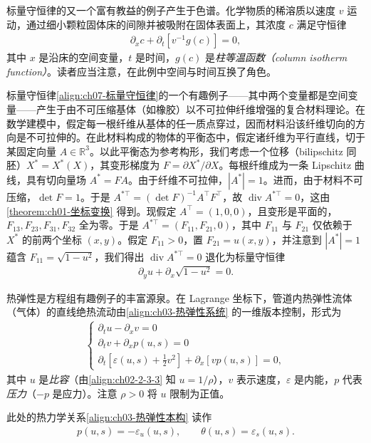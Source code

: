 \documentclass[../../main.tex]{subfiles}
\begin{document}
标量守恒律的又一个富有教益的例子产生于色谱。化学物质的稀溶质以速度 $v$ 运动，通过细小颗粒固体床的间隙并被吸附在固体表面上，其浓度 $c$ 满足守恒律
\begin{align}
\partial_x c+\partial_t[v^{-1}g(c)]=0,
\label{align:ch07-色谱}
\end{align}
其中 $x$ 是沿床的空间变量，$t$ 是时间，$g(c)$ 是\emph{柱等温函数（column isotherm function）}。读者应当注意，在此例中空间与时间互换了角色。

标量守恒律\eqref{align:ch07-标量守恒律}的一个有趣例子——其中两个变量都是空间变量——产生于由不可压缩基体（如橡胶）以不可拉伸纤维增强的复合材料理论。在数学建模中，假定每一根纤维从基体的任一质点穿过，因而材料沿该纤维切向的方向是不可拉伸的。在此材料构成的物体的平衡态中，假定诸纤维为平行直线，切于某固定向量 $A\in\mathbb{R}^3$。以此平衡态为参考构形，我们考虑一个位移（bilipschitz 同胚）$X^*=X^*(X)$，其变形梯度为 $F=\partial X^*/\partial X$。每根纤维成为一条 Lipschitz 曲线，具有切向量场 $A^*=FA$。由于纤维不可拉伸，$|A^*|=1$。进而，由于材料不可压缩，$\det F=1$。于是 $A^{*\top}=(\det F)^{-1}A^\top F^\top$，故 $\operatorname{div}A^{*\top}=0$，这由\cref{theorem:ch01-坐标变换}
得到。现假定 $A^\top=(1,0,0)$，且变形是平面的，$F_{13},F_{23},F_{31},F_{32}$ 全为零。于是 $A^{*\top}=(F_{11},F_{21},0)$，其中 $F_{11}$ 与 $F_{21}$ 仅依赖于 $X^*$ 的前两个坐标 $(x,y)$。假定 $F_{11}>0$，置 $F_{21}=u(x,y)$，并注意到 $|A^*|=1$ 蕴含 $F_{11}=\sqrt{1-u^2}$，我们得出 $\operatorname{div}A^{*\top}=0$ 退化为标量守恒律
\begin{align}
\partial_y u+\partial_x\sqrt{1-u^2}=0.
\label{align:ch07-纤维增强}
\end{align}

热弹性是方程组有趣例子的丰富源泉。在 Lagrange 坐标下，管道内热弹性流体（气体）的直线绝热流动由\eqref{align:ch03-热弹性系统}
的一维版本控制，形式为
\begin{align}
\begin{cases}
\partial_t u-\partial_x v=0\\
\partial_t v+\partial_x p(u,s)=0\\
\partial_t\left[\varepsilon(u,s)+\tfrac12 v^2\right]+\partial_x[v p(u,s)]=0,
\end{cases}
\label{align:ch07-热弹性}
\end{align}
其中 $u$ 是\emph{比容}（由\eqref{align:ch02-2-3-3}
知 $u=1/\rho$），$v$ 表示速度，$\varepsilon$ 是内能，$p$ 代表\emph{压力}（$-p$ 是应力）。注意 $\rho>0$ 将 $u$ 限制为正值。

此处的热力学关系\eqref{align:ch03-热弹性本构}
读作
\begin{align}
p(u,s)=-\varepsilon_u(u,s),\qquad \theta(u,s)=\varepsilon_s(u,s).
\label{align:ch07-热力学}
\end{align}
\end{document}
